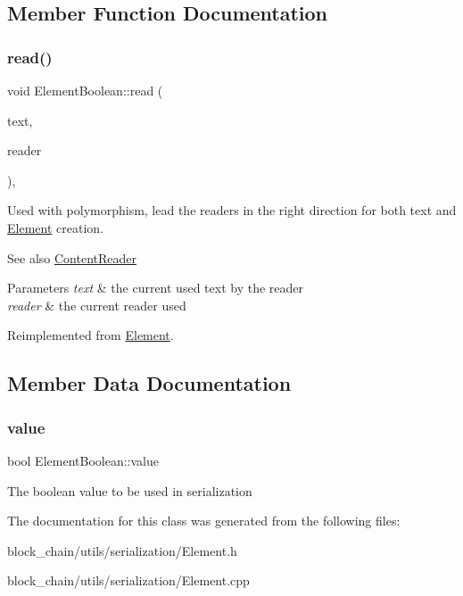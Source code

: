 \subsection{Member Function Documentation}
\mbox{\label{classElementBoolean_afca7544719a8e13fb38f62d57df343b7}} 
\subsubsection{\texorpdfstring{read()}{read()}}
{\footnotesize\ttfamily void Element\+Boolean\+::read (\begin{DoxyParamCaption}\item[{std\+::string \&}]{text,  }\item[{const \mbox{\hyperlink{classContentReader}{Content\+Reader}} $\ast$}]{reader }\end{DoxyParamCaption})\hspace{0.3cm}{\ttfamily [override]}, {\ttfamily [virtual]}}

Used with polymorphism, lead the readers in the right direction for both text and \mbox{\hyperlink{classElement}{Element}} creation. \begin{DoxySeeAlso}{See also}
\mbox{\hyperlink{classContentReader}{Content\+Reader}}
\end{DoxySeeAlso}

\begin{DoxyParams}{Parameters}
{\em text} & the current used text by the reader \\
\hline
{\em reader} & the current reader used \\
\hline
\end{DoxyParams}


Reimplemented from \mbox{\hyperlink{classElement_ab468bd37a9558f5227837a9236bc9e4b}{Element}}.



\subsection{Member Data Documentation}
\mbox{\label{classElementBoolean_a470b48a447bd7704bbf57fc42d78a4e2}} 
\subsubsection{\texorpdfstring{value}{value}}
{\footnotesize\ttfamily bool Element\+Boolean\+::value}

The boolean value to be used in serialization 

The documentation for this class was generated from the following files\+:\begin{DoxyCompactItemize}
\item 
block\+\_\+chain/utils/serialization/Element.\+h\item 
block\+\_\+chain/utils/serialization/Element.\+cpp\end{DoxyCompactItemize}
